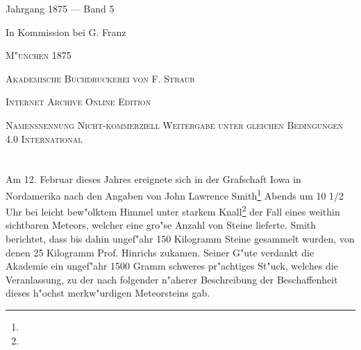 \documentclass[a4paper, 11pt, oneside]{article}
\begin{document}
\begin{titlepage}
	{\Large Jahrgang 1875 --- Band 5} %
	
	\vspace*{1\baselineskip} %
	
    {\Large In Kommission bei G. Franz} %
    
    \vspace*{\fill}

	\vspace{1\baselineskip}

	{\small\scshape M"unchen 1875}
	
	{\small\scshape{Akademische Buchdruckerei von F. Straub}}
	
	\vspace{0.5\baselineskip} %

    \scshape Internet Archive Online Edition  %
	
	{\scshape\small Namensnennung Nicht-kommerziell Weitergabe unter gleichen Bedingungen 4.0 International} %
\end{titlepage}
\setlength{\parskip}{1mm plus1mm minus1mm}
\clearpage
\tableofcontents
\clearpage
\LARGE
\pagestyle{fancy}
\fancyhf{}
\cfoot{\frakfamily{\thepage}}
\section{}
\subsection*{}
\paragraph{}
Am 12. Februar dieses Jahres ereignete sich in der Grafschaft Iowa in Nordamerika nach den Angaben von John Lawrence Smith\footnote{} Abends um 10 1/2 Uhr bei leicht bew"olktem Himmel unter starkem Knall\footnote{} der Fall eines weithin sichtbaren Meteors, welcher eine gro"se Anzahl von Steine lieferte. Smith berichtet, dass bis dahin ungef"ahr 150 Kilogramm Steine gesammelt wurden, von denen 25 Kilogramm Prof. Hinrichs zukamen. Seiner G"ute verdankt die Akademie ein ungef"ahr 1500 Gramm schweres pr"achtiges St"uck, welches die Veranlassung, zu der nach folgender n"aherer Beschreibung der Beschaffenheit dieses h"ochst merkw"urdigen Meteorsteins gab.
\end{document}
